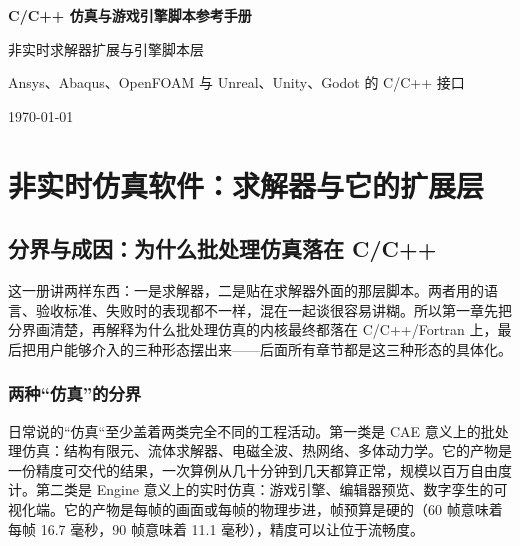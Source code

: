 \documentclass[12pt,a4paper,fontset=fandol]{ctexbook}
\newcommand{\Bk}{\discretionary{}{}{}}
\newcommand{\Lang}[1]{\textsf{#1}}
\newcommand{\CL}{\Lang{C}}
\newcommand{\CPP}{\Lang{C++}}
\newcommand{\DomCAE}{\Lang{CAE}}
\newcommand{\DomEngine}{\Lang{Engine}}
\begin{document}
\frontmatter

\begin{titlepage}
\centering
\vspace*{4cm}
{\Huge\bfseries C/C++ 仿真与游戏引擎脚本参考手册\par}
\vspace{1cm}
{\LARGE 非实时求解器扩展与引擎脚本层\par}
\vspace{0.4cm}
{\Large Ansys、Abaqus、OpenFOAM 与 Unreal、Unity、Godot 的 C/C++ 接口\par}
\vfill
{\large \today\par}
\end{titlepage}

\tableofcontents

\mainmatter

\cleardoublepage


\part{非实时仿真软件：求解器与它的扩展层}

\chapter{分界与成因：为什么批处理仿真落在 C/C++}
\label{ch:ch01-boundary}

这一册讲两样东西：一是求解器，二是贴在求解器外面的那层脚本。两者用的语言、验收标准、失败时的表现都不一样，混在一起谈很容易讲糊。所以第一章先把分界画清楚，再解释为什么批处理仿真的内核最终都落在 \CL/{\Bk}\CPP{}/Fortran 上，最后把用户能够介入的三种形态摆出来——后面所有章节都是这三种形态的具体化。

\section{两种``仿真''的分界}
\label{sec:ch01-divide}

日常说的``仿真``至少盖着两类完全不同的工程活动。第一类是 \DomCAE{} 意义上的批处理仿真：结构有限元、流体求解器、电磁全波、热网络、多体动力学。它的产物是一份精度可交代的结果，一次算例从几十分钟到几天都算正常，规模以百万自由度计。第二类是 \DomEngine{} 意义上的实时仿真：游戏引擎、编辑器预览、数字孪生的可视化端。它的产物是每帧的画面或每帧的物理步进，帧预算是硬的（60 帧意味着每帧 16.7 毫秒，90 帧意味着 11.1 毫秒），精度可以让位于流畅度。
\end{document}
